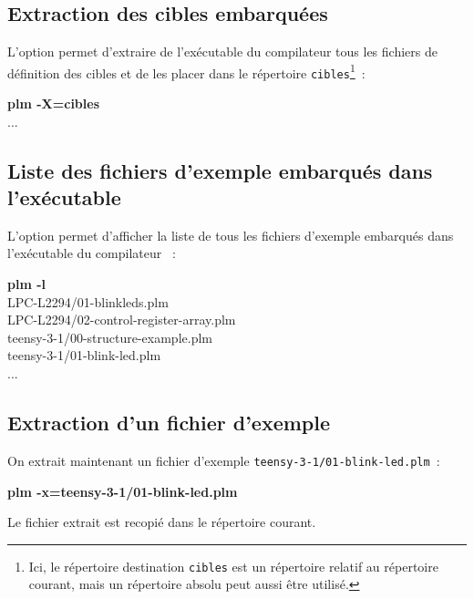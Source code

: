 \subsection{Extraction des cibles embarquées}
L'option  permet d'extraire de l'exécutable du compilateur tous les fichiers de définition des cibles et de les placer dans le répertoire \texttt{cibles}\footnote{Ici, le répertoire destination \texttt{cibles} est un répertoire relatif au répertoire courant, mais un répertoire absolu peut aussi être utilisé.}~:
\begin{SHELL}
{\bfseries plm -X=cibles}\\
\hspace*{1.2em}...
\end{SHELL}





\subsection{Liste des fichiers d'exemple embarqués dans l'exécutable}
L'option  permet d'afficher la liste de tous les fichiers d'exemple embarqués dans l'exécutable du compilateur ~:
\begin{SHELL}
{\bfseries plm -l}\\
\hspace*{1.2em}LPC-L2294/01-blinkleds.plm\\
\hspace*{1.2em}LPC-L2294/02-control-register-array.plm\\
\hspace*{1.2em}teensy-3-1/00-structure-example.plm\\
\hspace*{1.2em}teensy-3-1/01-blink-led.plm\\
\hspace*{1.2em}...
\end{SHELL}




\subsection{Extraction d'un fichier d'exemple}
On extrait maintenant un fichier d'exemple \texttt{teensy-3-1/01-blink-led.plm}~:
\begin{SHELL}
\bfseries plm -x=teensy-3-1/01-blink-led.plm
\end{SHELL}

Le fichier extrait est recopié dans le répertoire courant.






